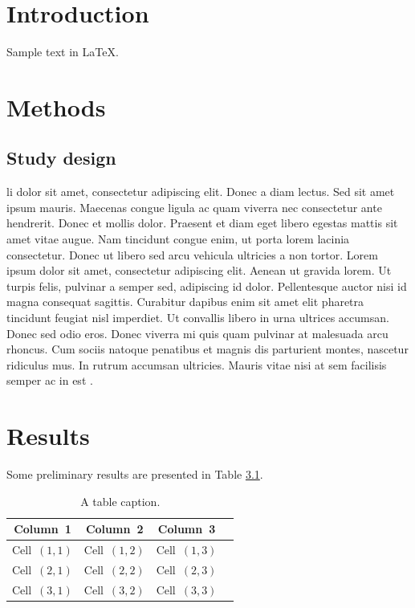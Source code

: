 \chapter{Introduction}

Sample text in \LaTeX.

\chapter{Methods}

\section{Study design}

\gls{li} dolor sit amet, consectetur adipiscing elit. Donec a diam lectus. Sed sit amet ipsum mauris. Maecenas congue ligula ac quam viverra nec consectetur ante hendrerit. Donec et mollis dolor. Praesent et diam eget libero egestas mattis sit amet vitae augue. Nam tincidunt congue enim, ut porta lorem lacinia consectetur. Donec ut libero sed arcu vehicula ultricies a non tortor. Lorem ipsum dolor sit amet, consectetur adipiscing elit. Aenean ut gravida lorem. Ut turpis felis, pulvinar a semper sed, adipiscing id dolor. Pellentesque auctor nisi id magna consequat sagittis. Curabitur dapibus enim sit amet elit pharetra tincidunt feugiat nisl imperdiet. Ut convallis libero in urna ultrices accumsan. Donec sed odio eros. Donec viverra mi quis quam pulvinar at malesuada arcu rhoncus. Cum sociis natoque penatibus et magnis dis parturient montes, nascetur ridiculus mus. In rutrum accumsan ultricies. Mauris vitae nisi at sem facilisis semper ac in est \citep{cicero1839}.

\chapter{Results}

Some preliminary results are presented in Table \ref{tab:sample_table}.

\begin{table}
	\center
	\caption{A table caption.}
	\label{tab:sample_table}
	\begin{tabular}{c c c c}
		\toprule
		\bfseries{Column~1} & \bfseries{Column~2} & \bfseries{Column~3} \\
		\midrule
		Cell~$(1,1)$                   & Cell~$(1,2)$                   & Cell~$(1,3)$                   \\
		Cell~$(2,1)$                   & Cell~$(2,2)$                   & Cell~$(2,3)$                   \\
		Cell~$(3,1)$                   & Cell~$(3,2)$                   & Cell~$(3,3)$                   \\
		\bottomrule
	\end{tabular}
\end{table}

